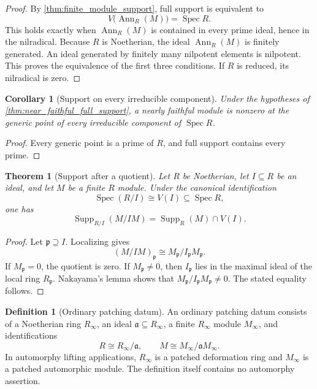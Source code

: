 \documentclass[11pt]{amsart}
\newtheorem{theorem}{Theorem}[section]
\newtheorem{corollary}[corollary]{Corollary}
\theoremstyle{definition}
\newtheorem{definition}[definition]{Definition}
\theoremstyle{remark}
\newcommand{\Spec}{\operatorname{Spec}}
\newcommand{\Supp}{\operatorname{Supp}}
\newcommand{\Ann}{\operatorname{Ann}}
\newcommand{\frakp}{\mathfrak p}
\newcommand{\fraka}{\mathfrak a}
\begin{document}
\begin{proof}
By \cref{thm:finite_module_support}, full support is equivalent to
\[
V\bigl(\Ann_R(M)\bigr)=\Spec R.
\]
This holds exactly when \(\Ann_R(M)\) is contained in every prime ideal, hence in the nilradical. Because \(R\) is Noetherian, the ideal \(\Ann_R(M)\) is finitely generated. An ideal generated by finitely many nilpotent elements is nilpotent. This proves the equivalence of the first three conditions. If \(R\) is reduced, its nilradical is zero.
\end{proof}

\begin{corollary}[Support on every irreducible component]\label{cor:every_component_support}
Under the hypotheses of \cref{thm:near_faithful_full_support}, a nearly faithful module is nonzero at the generic point of every irreducible component of \(\Spec R\).
\end{corollary}

\begin{proof}
Every generic point is a prime of \(R\), and full support contains every prime.
\end{proof}

\begin{theorem}[Support after a quotient]\label{thm:quotient_support}
Let \(R\) be Noetherian, let \(I\subseteq R\) be an ideal, and let \(M\) be a finite \(R\) module. Under the canonical identification
\[
\Spec(R/I)\cong V(I)\subseteq\Spec R,
\]
one has
\[
\boxed{
\Supp_{R/I}(M/IM)
=
\Supp_R(M)\cap V(I).
}
\]
\end{theorem}

\begin{proof}
Let \(\frakp\supseteq I\). Localizing gives
\[
(M/IM)_{\frakp}
\cong
M_{\frakp}/I_{\frakp}M_{\frakp}.
\]
If \(M_{\frakp}=0\), the quotient is zero. If \(M_{\frakp}\neq0\), then
\(I_{\frakp}\) lies in the maximal ideal of the local ring \(R_{\frakp}\). Nakayama's lemma shows that
\(M_{\frakp}/I_{\frakp}M_{\frakp}\neq0\). The stated equality follows.
\end{proof}

\begin{definition}[Ordinary patching datum]\label{def:ordinary_patching_datum}
An ordinary patching datum consists of a Noetherian ring \(R_\infty\), an ideal
\(\fraka\subseteq R_\infty\), a finite \(R_\infty\) module \(M_\infty\), and identifications
\[
R\cong R_\infty/\fraka,
\qquad
M\cong M_\infty/\fraka M_\infty.
\]
In automorphy lifting applications, \(R_\infty\) is a patched deformation ring and \(M_\infty\) is a patched automorphic module. The definition itself contains no automorphy assertion.
\end{definition}
\end{document}
